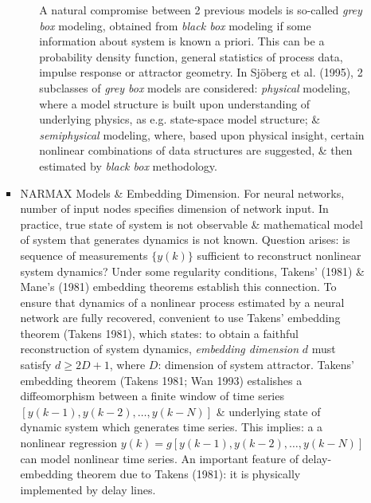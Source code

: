 \documentclass{article}
\begin{document}
\begin{enumerate}
\begin{itemize}
\begin{itemize}
\begin{itemize}
				A natural compromise between 2 previous models is so-called {\it grey box} modeling, obtained from {\it black box} modeling if some information about system is known a priori. This can be a probability density function, general statistics of process data, impulse response or attractor geometry. In Sjöberg et al. (1995), 2 subclasses of {\it grey box} models are considered: {\it physical} modeling, where a model structure is built upon understanding of underlying physics, as e.g. state-space model structure; \& {\it semiphysical} modeling, where, based upon physical insight, certain nonlinear combinations of data structures are suggested, \& then estimated by {\it black box} methodology.
			\end{itemize}
			\item {\sf NARMAX Models \& Embedding Dimension.} For neural networks, number of input nodes specifies dimension of network input. In practice, true state of system is not observable \& mathematical model of system that generates dynamics is not known. Question arises: is sequence of measurements $\{y(k)\}$ sufficient to reconstruct nonlinear system dynamics? Under some regularity conditions, Takens' (1981) \& Mane's (1981) embedding theorems establish this connection. To ensure that dynamics of a nonlinear process estimated by a neural network are fully recovered, convenient to use Takens' embedding theorem (Takens 1981), which states: to obtain a faithful reconstruction of system dynamics, {\it embedding dimension} $d$ must satisfy $d\ge2D + 1$, where $D$: dimension of system attractor. Takens' embedding theorem (Takens 1981; Wan 1993) estalishes a diffeomorphism between a finite window of time series $[y(k - 1),y(k - 2),\ldots,y(k - N)]$ \& underlying state of dynamic system which generates time series. This implies: a a nonlinear regression $y(k) = g[y(k - 1),y(k - 2),\ldots,y(k - N)]$ can model nonlinear time series. An important feature of delay-embedding theorem due to Takens (1981): it is physically implemented by delay lines.
			

\end{itemize}
\end{itemize}
\end{enumerate}
\end{document}
